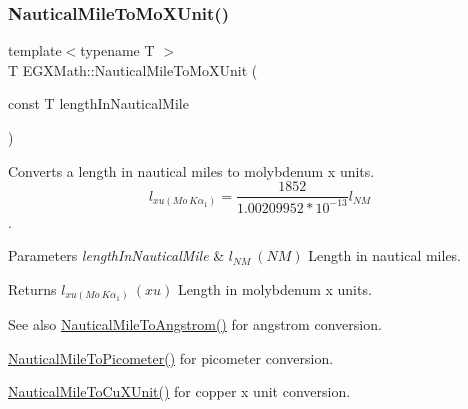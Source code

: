 \subsubsection{\texorpdfstring{Nautical\+Mile\+To\+Mo\+X\+Unit()}{NauticalMileToMoXUnit()}}
{\footnotesize\ttfamily template$<$typename T $>$ \\
T E\+G\+X\+Math\+::\+Nautical\+Mile\+To\+Mo\+X\+Unit (\begin{DoxyParamCaption}\item[{const T}]{length\+In\+Nautical\+Mile }\end{DoxyParamCaption})}



Converts a length in nautical miles to molybdenum x units. \[ l_{xu(Mo\ K\alpha_1)}=\frac{1852}{1.00209952*10^{-13}} l_{NM}\]. 


\begin{DoxyParams}{Parameters}
{\em length\+In\+Nautical\+Mile} & $ l_{NM}\ (NM)$ Length in nautical miles. \\
\hline
\end{DoxyParams}
\begin{DoxyReturn}{Returns}
$ l_{xu(Mo\ K\alpha_1)}\ (xu)$ Length in molybdenum x units. 
\end{DoxyReturn}
\begin{DoxySeeAlso}{See also}
\mbox{\hyperlink{group___e_g_x_math-_conversions-_length_conversions-_nautical-_nautical_mile-_non-_s_i_ga6f451e4456d985c7d63b39a084b3dd23}{Nautical\+Mile\+To\+Angstrom()}} for angstrom conversion. 

\mbox{\hyperlink{group___e_g_x_math-_conversions-_length_conversions-_nautical-_nautical_mile-_s_i_ga5ab6a92054685d45fb032111bcde94e0}{Nautical\+Mile\+To\+Picometer()}} for picometer conversion. 

\mbox{\hyperlink{group___e_g_x_math-_conversions-_length_conversions-_nautical-_nautical_mile-_non-_s_i_gaa0638917756d520cfc0877dcde60d777}{Nautical\+Mile\+To\+Cu\+X\+Unit()}} for copper x unit conversion. 
\end{DoxySeeAlso}
